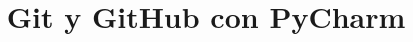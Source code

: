 \documentclass[aspectratio=169]{beamer}
\title[Git y GitHub con PyCharm]{Git y GitHub con PyCharm} %
\begin{document}
\begin{frame}
    \titlepage
\end{frame}


\end{document}
